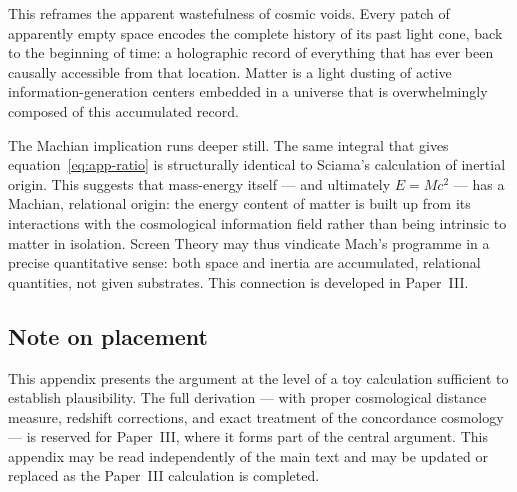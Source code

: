 \documentclass[12pt]{article}
\begin{document}
This reframes the apparent wastefulness of cosmic voids.
Every patch of apparently empty space encodes the complete history
of its past light cone, back to the beginning of time: a holographic
record of everything that has ever been causally accessible from
that location.
Matter is a light dusting of active information-generation centers
embedded in a universe that is overwhelmingly composed of this
accumulated record.

The Machian implication runs deeper still.
The same integral that gives equation~\eqref{eq:app-ratio} is
structurally identical to Sciama's calculation of
inertial origin.
This suggests that mass-energy itself --- and ultimately $E = Mc^2$
--- has a Machian, relational origin: the energy content of matter
is built up from its interactions with the cosmological information
field rather than being intrinsic to matter in isolation.
Screen Theory may thus vindicate Mach's programme in a precise
quantitative sense: both space and inertia are accumulated,
relational quantities, not given substrates.
This connection is developed in Paper~III.

\subsection*{Note on placement}

This appendix presents the argument at the level of a toy calculation
sufficient to establish plausibility.
The full derivation --- with proper cosmological distance measure,
redshift corrections, and exact treatment of the concordance cosmology
--- is reserved for Paper~III, where it forms part of the central
argument.
This appendix may be read independently of the main text and may be
updated or replaced as the Paper~III calculation is completed.
\end{document}
